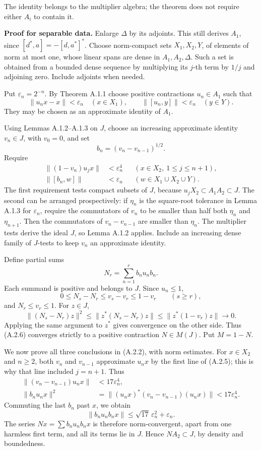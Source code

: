 \documentclass[
  11pt,
]{article}
\begin{document}
The identity belongs to the multiplier algebra; the theorem does not
require either \(A_i\) to contain it.

\textbf{Proof for separable data.} Enlarge \(\Delta\) by its adjoints.
This still derives \(A_1\), since \([d^*,a]=-[d,a^*]^*\). Choose
norm-compact sets \(X_1,X_2,Y\), of elements of norm at most one, whose
linear spans are dense in \(A_1,A_2,\Delta\). Such a set is obtained
from a bounded dense sequence by multiplying its \(j\)-th term by
\(1/j\) and adjoining zero. Include adjoints when needed.

Put \(\varepsilon_n=2^{-n}\). By Theorem A.1.1 choose positive
contractions \(u_n\in A_1\) such that \[
\|u_nx-x\|<\varepsilon_n\quad(x\in X_1),\qquad
\|[u_n,y]\|<\varepsilon_n\quad(y\in Y).
\tag{A.2.3}
\] They may be chosen as an approximate identity of \(A_1\).

Using Lemmas A.1.2--A.1.3 on \(J\), choose an increasing approximate
identity \(v_n\in J\), with \(v_0=0\), and set \[
b_n=(v_n-v_{n-1})^{1/2}.
\tag{A.2.4}
\] Require \[
\begin{aligned}
\|(1-v_n)u_jx\|&<\varepsilon_n^4
&& (x\in X_2,\ 1\leq j\leq n+1),\\
\|[b_n,w]\|&<\varepsilon_n
&& (w\in X_1\cup X_2\cup Y).
\end{aligned}
\tag{A.2.5}
\] The first requirement tests compact subsets of \(J\), because
\(u_jX_2\subset A_1A_2\subset J\). The second can be arranged
prospectively: if \(\eta_n\) is the square-root tolerance in Lemma A.1.3
for \(\varepsilon_n\), require the commutators of \(v_n\) to be smaller
than half both \(\eta_n\) and \(\eta_{n+1}\). Then the commutators of
\(v_n-v_{n-1}\) are smaller than \(\eta_n\). The multiplier tests derive
the ideal \(J\), so Lemma A.1.2 applies. Include an increasing dense
family of \(J\)-tests to keep \(v_n\) an approximate identity.

Define partial sums \[
N_r=\sum_{n=1}^r b_nu_nb_n.
\tag{A.2.6}
\] Each summand is positive and belongs to \(J\). Since \(u_n\leq1\), \[
0\leq N_s-N_r\leq v_s-v_r\leq1-v_r\qquad(s\geq r),
\tag{A.2.7}
\] and \(N_r\leq v_r\leq1\). For \(z\in J\), \[
\|(N_s-N_r)z\|^2
\leq\|z^*(N_s-N_r)z\|
\leq\|z^*(1-v_r)z\|\longrightarrow0.
\tag{A.2.8}
\] Applying the same argument to \(z^*\) gives convergence on the other
side. Thus (A.2.6) converges strictly to a positive contraction
\(N\in M(J)\). Put \(M=1-N\).

We now prove all three conclusions in (A.2.2), with norm estimates. For
\(x\in X_2\) and \(n\geq2\), both \(v_n\) and \(v_{n-1}\) approximate
\(u_nx\) by the first line of (A.2.5); this is why that line included
\(j=n+1\). Thus \[
\begin{aligned}
\|(v_n-v_{n-1})u_nx\|&<17\varepsilon_n^4,\\
\|b_nu_nx\|^2
&=\|(u_nx)^*(v_n-v_{n-1})(u_nx)\|
<17\varepsilon_n^4.
\end{aligned}
\tag{A.2.9}
\] Commuting the last \(b_n\) past \(x\), we obtain \[
\|b_nu_nb_nx\|
\leq\sqrt{17}\,\varepsilon_n^2+\varepsilon_n.
\tag{A.2.10}
\] The series \(Nx=\sum b_nu_nb_nx\) is therefore norm-convergent, apart
from one harmless first term, and all its terms lie in \(J\). Hence
\(NA_2\subset J\), by density and boundedness.
\end{document}
